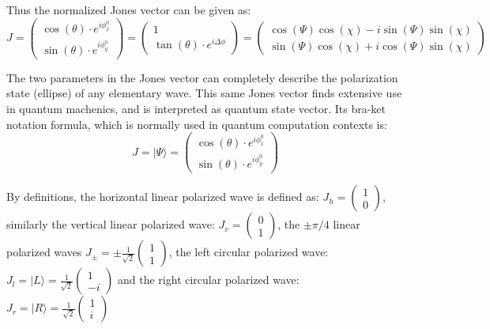 Thus the normalized Jones vector can be given as:
\begin{equation}
J = 
\left(
\begin{array}{c}
	\cos(\theta) \cdot e^{i \phi_x^0} \\
	\sin(\theta) \cdot e^{i \phi_y^0}
\end{array}
\right)
=
\left(
\begin{array}{c}
	1\\
	\tan(\theta) \cdot e^{i \Delta \phi}
\end{array}
\right)
=
\left(
\begin{array}{c}
	\cos(\Psi) \cos(\chi) - i \sin(\Psi) \sin(\chi) \\
	\sin(\Psi) \cos(\chi) + i \cos(\Psi) \sin(\chi)
\end{array}
\right)
\end{equation}

The two parameters in the Jones vector can completely describe the polarization state (ellipse) of any elementary wave.
This same Jones vector finds extensive use in quantum machenics, and is interpreted as quantum state vector.
Its bra-ket notation formula, which is normally used in quantum computation contexts is:
\begin{equation}
J = | \Psi \rangle 
= 
\left(
\begin{array}{c}
	\cos(\theta) \cdot e^{i \phi_x^0} \\
	\sin(\theta) \cdot e^{i \phi_y^0}
\end{array}
\right)
\end{equation}

By definitions, the horizontal linear polarized wave is defined as: $J_h = \left(
\begin{array}{c}
 1 \\
 0
\end{array}
\right)$, similarly the vertical linear polarized wave: $J_v = \left(
\begin{array}{c}
 0 \\
 1
\end{array}
\right)$, the $\pm \pi/4$ linear polarized waves $J_{\pm} = \pm \frac{1}{\sqrt{2}} \left(
\begin{array}{c}
 1 \\
 1
\end{array}
\right)$, the left circular polarized wave: $J_l = |L\rangle = \frac{1}{\sqrt{2}} \left(
\begin{array}{c}
 1 \\
 -i
\end{array}
\right)$ and the right circular polarized wave: $J_r = |R\rangle = \frac{1}{\sqrt{2}} \left(
\begin{array}{c}
 1 \\
 i
\end{array}
\right)$

